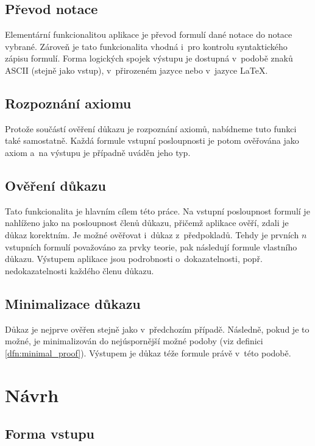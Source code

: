 \documentclass[thesis=B,czech,hidelinks]{thesis}[2012/06/26]
\begin{document}
\subsection{Převod notace}

Elementární funkcionalitou aplikace je převod formulí dané notace do notace vybrané. Zároveň je tato funkcionalita vhodná i~pro kontrolu syntaktického zápisu formulí. Forma logických spojek výstupu je dostupná v~podobě znaků ASCII (stejně jako vstup), v~přirozeném jazyce nebo v~jazyce \LaTeX.

\subsection{Rozpoznání axiomu}

Protože součástí ověření důkazu je rozpoznání axiomů, nabídneme tuto funkci také samostatně. Každá formule vstupní posloupnosti je potom ověřována jako axiom a~na výstupu je případně uváděn jeho typ.

\subsection{Ověření důkazu}

Tato funkcionalita je hlavním cílem této práce. Na vstupní posloupnost formulí je nahlíženo jako na posloupnost členů důkazu, přičemž aplikace ověří, zdali je důkaz korektním. Je možné ověřovat i~důkaz z~předpokladů. Tehdy je prvních $n$ vstupních formulí považováno za prvky teorie, pak následují formule vlastního důkazu. Výstupem aplikace jsou podrobnosti o~dokazatelnosti, popř. nedokazatelnosti každého členu důkazu.

\subsection{Minimalizace důkazu}

Důkaz je nejprve ověřen stejně jako v~předchozím případě. Následně, pokud je to možné, je minimalizován do nejúspornější možné podoby (viz definici \ref{dfn:minimal_proof}). Výstupem je důkaz téže formule právě v~této podobě.

\section{Návrh}

\subsection{Forma vstupu}
\end{document}
